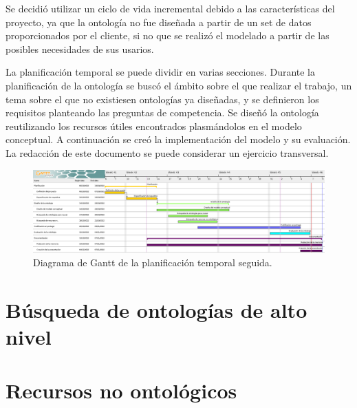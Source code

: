 \documentclass[a4paper,12pt]{article}
\begin{document}
	Se decidió utilizar un ciclo de vida incremental debido a las características del proyecto, ya que la ontología no fue diseñada a partir de un set de datos proporcionados por el cliente, si no que se realizó el modelado a partir de las posibles necesidades de sus usarios. 
	
	La planificación temporal se puede dividir en varias secciones. Durante la planificación de la ontología se buscó el ámbito sobre el que realizar el trabajo, un tema sobre el que no existiesen ontologías ya diseñadas, y se definieron los requisitos planteando las preguntas de competencia. Se diseñó la ontología reutilizando los recursos útiles encontrados plasmándolos en el modelo conceptual. A continuación se creó la implementación del modelo y su evaluación. La redacción de este documento se puede considerar un ejercicio transversal.
	
	\begin{figure}[H]
		\centering
		\includegraphics[width=\textwidth]{include/gantt_ontologia.png}
		\caption{Diagrama de Gantt de la planificación temporal seguida.}
	\end{figure}
	
	\section{Búsqueda de ontologías de alto nivel}
	
	\section{Recursos no ontológicos}
	
\end{document}
